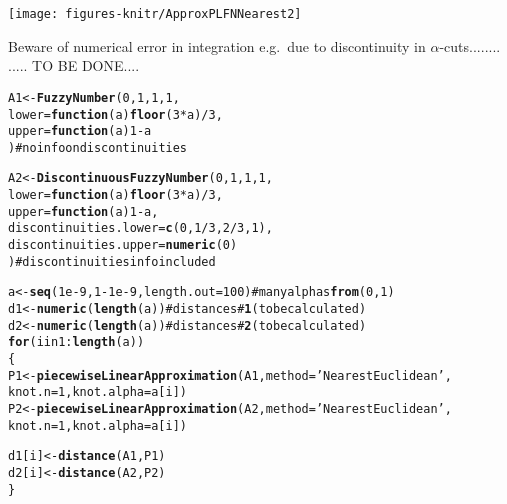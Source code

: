\documentclass[11pt]{article}\usepackage{graphicx, color}
\makeatletter
\newcommand{\hlfunctioncall}[1]{\textcolor[rgb]{0.501960784313725,0,0.329411764705882}{\textbf{#1}}}%
\newcommand{\hlstring}[1]{\textcolor[rgb]{0.6,0.6,1}{#1}}%
\newcommand{\hlcomment}[1]{\textcolor[rgb]{0.180392156862745,0.6,0.341176470588235}{#1}}%
\newenvironment{kframe}{%
 \def\at@end@of@kframe{}%
 \ifinner\ifhmode%
  \def\at@end@of@kframe{\end{minipage}}%
  \begin{minipage}{\columnwidth}%
 \fi\fi%
 \def\FrameCommand##1{\hskip\@totalleftmargin \hskip-\fboxsep
 \colorbox{shadecolor}{##1}\hskip-\fboxsep
     \hskip-\linewidth \hskip-\@totalleftmargin \hskip\columnwidth}%
 \MakeFramed {\advance\hsize-\width
   \@totalleftmargin\z@ \linewidth\hsize
   \@setminipage}}%
 {\par\unskip\endMakeFramed%
 \at@end@of@kframe}
\newenvironment{knitrout}{}{} %
\makeatother
\begin{document}
\begin{center}
\begin{knitrout}\small
{}\color{fgcolor}

{\centering \texttt{[image: figures-knitr/ApproxPLFNNearest2]} 

}



\end{knitrout}

\end{center}



\bigskip
Beware of numerical error in integration e.g.~due to discontinuity
in $\alpha$-cuts........
..... TO BE DONE....

\begin{knitrout}\small
{}\color{fgcolor}\begin{kframe}
\begin{alltt}
A1 <- \hlfunctioncall{FuzzyNumber}(0,1,1,1,
         lower=\hlfunctioncall{function}(a) \hlfunctioncall{floor}(3*a)/3,
         upper=\hlfunctioncall{function}(a) 1-a
) \hlcomment{# no info on discontinuities}

A2 <- \hlfunctioncall{DiscontinuousFuzzyNumber}(0,1,1,1,
         lower=\hlfunctioncall{function}(a) \hlfunctioncall{floor}(3*a)/3,
         upper=\hlfunctioncall{function}(a) 1-a,
         discontinuities.lower=\hlfunctioncall{c}(0, 1/3, 2/3, 1),
         discontinuities.upper=\hlfunctioncall{numeric}(0)
) \hlcomment{# discontinuities info included}

a <- \hlfunctioncall{seq}(1e-9, 1-1e-9, length.out=100) \hlcomment{# many alphas \hlfunctioncall{from} (0,1)}
d1 <- \hlfunctioncall{numeric}(\hlfunctioncall{length}(a)) \hlcomment{# distances #\hlfunctioncall{1} (to be calculated)}
d2 <- \hlfunctioncall{numeric}(\hlfunctioncall{length}(a)) \hlcomment{# distances #\hlfunctioncall{2} (to be calculated)}
\hlfunctioncall{for} (i in 1:\hlfunctioncall{length}(a))
\{
   P1 <- \hlfunctioncall{piecewiseLinearApproximation}(A1, method=\hlstring{'NearestEuclidean'},
            knot.n=1, knot.alpha=a[i])
   P2 <- \hlfunctioncall{piecewiseLinearApproximation}(A2, method=\hlstring{'NearestEuclidean'},
            knot.n=1, knot.alpha=a[i])

   d1[i] <- \hlfunctioncall{distance}(A1, P1)
   d2[i] <- \hlfunctioncall{distance}(A2, P2)
\}
\end{alltt}
\end{kframe}
\end{knitrout}
\end{document}
